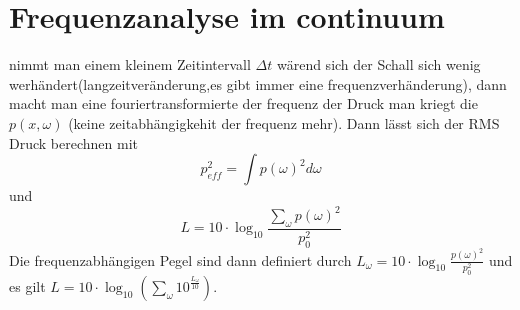 \documentclass[11pt,a4paper,DIV12,BCOR1.5mm]{scrartcl}
\begin{document}
\section{Frequenzanalyse im continuum}
nimmt man einem kleinem Zeitintervall $\Delta t$ wärend sich der Schall sich wenig werhändert(langzeitveränderung,es gibt immer eine frequenzverhänderung), dann macht man eine fouriertransformierte der frequenz der Druck man kriegt die $p(x,\omega)$ (keine zeitabhängigkehit der frequenz mehr). Dann lässt sich der RMS Druck berechnen mit
\begin{equation}
p_{eff}^2=\int p(\omega)^2 d\omega
\end{equation} 
und 
\begin{equation}
L=10\cdot \log_{10}\frac{\sum_\omega p(\omega)^2}{p_0^2}
\end{equation}
Die frequenzabhängigen Pegel sind dann definiert durch $L_{\omega}=10\cdot \log_{10}\frac{ p(\omega)^2}{p_0^2}$ und es gilt $L= 10\cdot\log_{10}\left(\sum_\omega 10^\frac{L_{\omega}}{10}\right)$.
\end{document}
